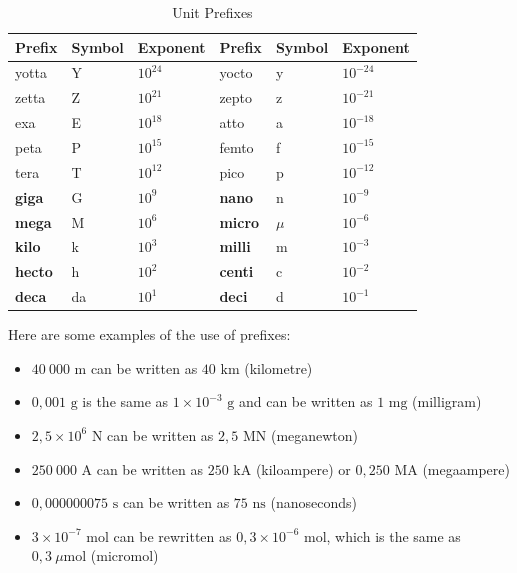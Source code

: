           \begin{table}[H]
        \begin{center}
    \noindent
      \begin{tabular}{|l|l|l|l|l|l|}\hline
\textbf{Prefix} & \textbf{Symbol}  & \textbf{Exponent} & \textbf{Prefix} & \textbf{Symbol} & \textbf{Exponent} \\ \hline
yotta           & Y                & ${10}^{24}$       & yocto           & y               & ${10}^{-24}$      \\ \hline
zetta           &  Z               & ${10}^{21}$       &  zepto          & z               & ${10}^{-21}$      \\ \hline
exa             &  E               & ${10}^{18}$       & atto            & a               & ${10}^{-18}$      \\ \hline
peta            & P                & ${10}^{15}$       & femto           & f               & ${10}^{-15}$      \\ \hline
tera            &  T               & ${10}^{12}$       &  pico           & p               & ${10}^{-12}$      \\ \hline
\textbf{giga}   & G                & ${10}^{9}$        & \textbf{nano}   & n               & ${10}^{-9}$       \\ \hline
\textbf{mega}   &  M               & ${10}^{6}$        & \textbf{micro}  & $\mu $          & ${10}^{-6}$       \\ \hline
\textbf{kilo}   &  k               & ${10}^{3}$        & \textbf{milli}  & m               & ${10}^{-3}$       \\ \hline
\textbf{hecto}  &  h               & ${10}^{2}$        & \textbf{centi}  & c               & ${10}^{-2}$       \\ \hline
\textbf{deca}   &  da              & ${10}^{1}$        & \textbf{deci}   & d               & ${10}^{-1}$       \\ \hline
    \end{tabular}
\caption{Unit Prefixes}
      \end{center}
\label{tab:unitprefixes}
\end{table}
Here are some examples of the use of prefixes:
\begin{itemize}[noitemsep]
  \item $40~000 \text{ m}$ can be written as $40 \text{ km}$ (kilometre)
  \item $0,001 \text{ g}$ is the same as $1 \times{10}^{-3} \text{ g}$ and can be written as $1 \text{ mg}$ (milligram)
  \item $2,5 \times {10}^{6}$ N can be written as $2,5 \text{ MN}$ (meganewton)
  \item $250~000 \text{ A}$ can be written as $250 \text{ kA}$ (kiloampere) or $0,250 \text{ MA}$ (megaampere)
  \item $0,000000075 \text{ s}$ can be written as $75 \text{ ns}$ (nanoseconds)
  \item $3 \times{10}^{-7} \text{ mol}$ can be rewritten as $0,3 \times{10}^{-6} \text{ mol}$, which is the same as $0,3 ~\mu \text{mol}$ (micromol)
\end{itemize}

